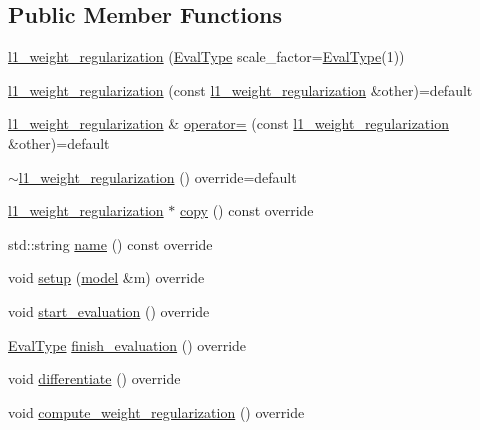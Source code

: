 \subsection*{Public Member Functions}
\begin{DoxyCompactItemize}
\item 
\hyperlink{classlbann_1_1l1__weight__regularization_a8416f2197baad2b9850163ecba72a4c4}{l1\+\_\+weight\+\_\+regularization} (\hyperlink{base_8hpp_a3266f5ac18504bbadea983c109566867}{Eval\+Type} scale\+\_\+factor=\hyperlink{base_8hpp_a3266f5ac18504bbadea983c109566867}{Eval\+Type}(1))
\item 
\hyperlink{classlbann_1_1l1__weight__regularization_a6d0bdc74e61eed4601667db4d64b45d3}{l1\+\_\+weight\+\_\+regularization} (const \hyperlink{classlbann_1_1l1__weight__regularization}{l1\+\_\+weight\+\_\+regularization} \&other)=default
\item 
\hyperlink{classlbann_1_1l1__weight__regularization}{l1\+\_\+weight\+\_\+regularization} \& \hyperlink{classlbann_1_1l1__weight__regularization_ae6f3b7de9357ffd852372bb7e25a0c6a}{operator=} (const \hyperlink{classlbann_1_1l1__weight__regularization}{l1\+\_\+weight\+\_\+regularization} \&other)=default
\item 
\hyperlink{classlbann_1_1l1__weight__regularization_ad7fc177a270eb8a1ddf08b9dd67b23ee}{$\sim$l1\+\_\+weight\+\_\+regularization} () override=default
\item 
\hyperlink{classlbann_1_1l1__weight__regularization}{l1\+\_\+weight\+\_\+regularization} $\ast$ \hyperlink{classlbann_1_1l1__weight__regularization_aa5cbb7a878224e152e8e425bb99ea09a}{copy} () const override
\item 
std\+::string \hyperlink{classlbann_1_1l1__weight__regularization_a4a41b6a07c36fc4f82364295a404ba1b}{name} () const override
\item 
void \hyperlink{classlbann_1_1l1__weight__regularization_afcd238514ad132d66609efbb30de25ec}{setup} (\hyperlink{classlbann_1_1model}{model} \&m) override
\item 
void \hyperlink{classlbann_1_1l1__weight__regularization_ace2c0fe490dd1e630460063b6df23597}{start\+\_\+evaluation} () override
\item 
\hyperlink{base_8hpp_a3266f5ac18504bbadea983c109566867}{Eval\+Type} \hyperlink{classlbann_1_1l1__weight__regularization_a5416b0c884e45854a03e0d2e2b3e63f3}{finish\+\_\+evaluation} () override
\item 
void \hyperlink{classlbann_1_1l1__weight__regularization_a329af165a876f4c1668aee84339e9ad2}{differentiate} () override
\item 
void \hyperlink{classlbann_1_1l1__weight__regularization_a9f2c29799fc60449f65bc1127b7514fb}{compute\+\_\+weight\+\_\+regularization} () override
\end{DoxyCompactItemize}
